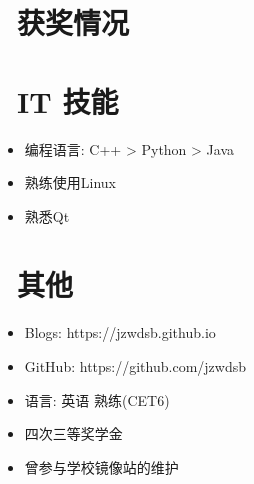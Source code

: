 \documentclass{resume}
\begin{document}
\begin{comment}
\datedsubsection{\textbf{\LaTeX\ résumé template}}{May. 2015 -- Present}
\role{\LaTeX, Maintainer}{Individual Projects}
An elegant \LaTeX\ résumé template, https://github.com/billryan/resume
\begin{itemize}
  \item Easy to be further customized or extended	
  \item Full support for unicode characters (e.g. CJK) with \XeLaTeX\
  \item FontAwesome 4.5.0 support
\end{itemize}
\end{comment}


\section{\faHeartO\ 获奖情况}


\section{\faCogs\ IT 技能}
\begin{itemize}[parsep=0.5ex]
  \item 编程语言: C++ > Python > Java
  \item 熟练使用Linux
  \item 熟悉Qt
\end{itemize}

\section{\faInfo\ 其他}
\begin{itemize}[parsep=0.5ex]
  \item Blogs: https://jzwdsb.github.io
  \item GitHub: https://github.com/jzwdsb
  \item 语言: 英语 熟练(CET6)
  \item 四次三等奖学金
  \item 曾参与学校镜像站的维护
\end{itemize}

%
%
\end{document}
